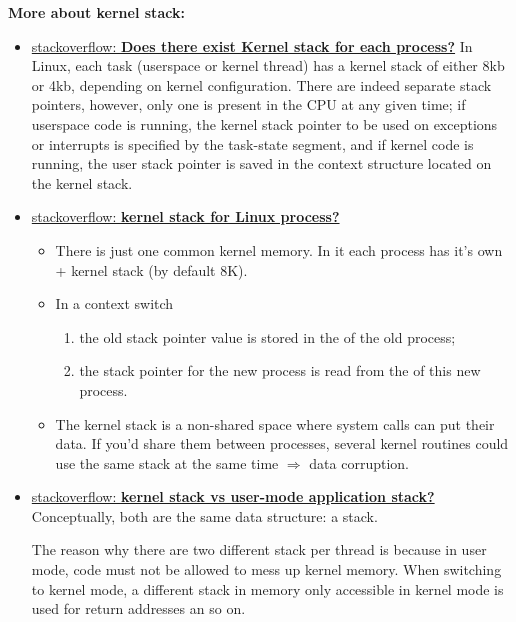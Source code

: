 \textbf{More about kernel stack:}
\begin{itemize}
\item
  \href{http://stackoverflow.com/questions/6083236/does-there-exist-kernel-stack-for-each-process/6083335#6083335}{%
    stackoverflow: \textbf{Does there exist Kernel stack for each process?}} In Linux,
  each task (userspace or kernel thread) has a kernel stack of either 8kb or 4kb,
  depending on kernel configuration. There are indeed separate stack pointers, however,
  only one is present in the CPU at any given time; if userspace code is running, the
  kernel stack pointer to be used on exceptions or interrupts is specified by the
  task-state segment, and if kernel code is running, the user stack pointer is saved in
  the context structure located on the kernel stack.
\item \href{http://stackoverflow.com/questions/886807/kernel-stack-for-linux-process}{%
    stackoverflow: \textbf{kernel stack for Linux process?}}
  \begin{itemize}
  \item There is just one common kernel memory. In it each process has it's own
     + kernel stack (by default 8K).
  \item In a context switch
    \begin{enumerate}
    \item the old stack pointer value is stored in the  of the old
      process;
    \item the stack pointer for the new process is read from the  of
      this new process.
    \end{enumerate}
  \item The kernel stack is a non-shared space where system calls can put their data. If
    you'd share them between processes, several kernel routines could use the same stack
    at the same time $\Rightarrow$ data corruption.
  \end{itemize}
\item
  \href{http://stackoverflow.com/questions/1974612/kernel-stack-vs-user-mode-application-stack/1974719#1974719}{%
    stackoverflow: \textbf{kernel stack vs user-mode application
      stack?}} Conceptually, both are the same
  data structure: a stack.

  The reason why there are two different stack per thread is because in user mode, code
  must not be allowed to mess up kernel memory. When switching to kernel mode, a different
  stack in memory only accessible in kernel mode is used for return addresses an so on.


\end{itemize}
